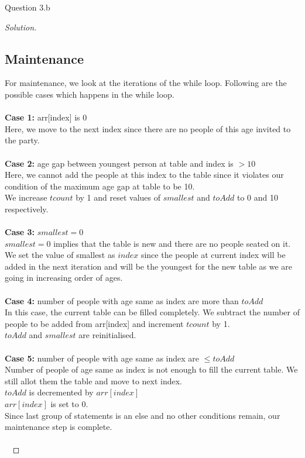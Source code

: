 \begin{solution}{Question 3.b}
\begin{proof}[Solution]
        \subsection*{Maintenance}
        For maintenance, we look at the iterations of the while loop. Following are the possible cases which happens in the while loop.\\
        \\
        \textbf{Case 1:} arr[index] is 0\\
        Here, we move to the next index since there are no people of this age invited to the party.\\
        \\
        \textbf{Case 2:} age gap between youngest person at table and index is $>10$\\
        Here, we cannot add the people at this index to the table since it violates our condition of the maximum age gap at table to be 10.\\
        We increase $tcount$ by 1 and reset values of $smallest$ and $toAdd$ to 0 and 10 respectively.\\
        \\
        \textbf{Case 3:} $smallest = 0$\\
        $smallest = 0$ implies that the table is new and there are no people seated on it.
        We set the value of smallest as $index$ since the people at current index will be added in the next iteration and will be the youngest for the new table as we are going in increasing order of ages.
        \\
        \\
        \textbf{Case 4:} number of people with age same as index are more than $toAdd$\\
        In this case, the current table can be filled completely. We subtract the number of people to be added from arr[index] and increment $tcount$ by 1.\\
        $toAdd$ and $smallest$ are reinitialised.
        \\
        \\
        \textbf{Case 5:} number of people with age same as index are $\leq toAdd$\\
        Number of people of age same as index is not enough to fill the current table. We still allot them the table and move to next index.\\
        $toAdd$ is decremented by $arr[index]$\\
        $arr[index]$ is set to 0.\\
        Since last group of statements is an else and no other conditions remain, our maintenance step is complete.
        \\
        \\\
        

\end{proof}
\end{solution}
